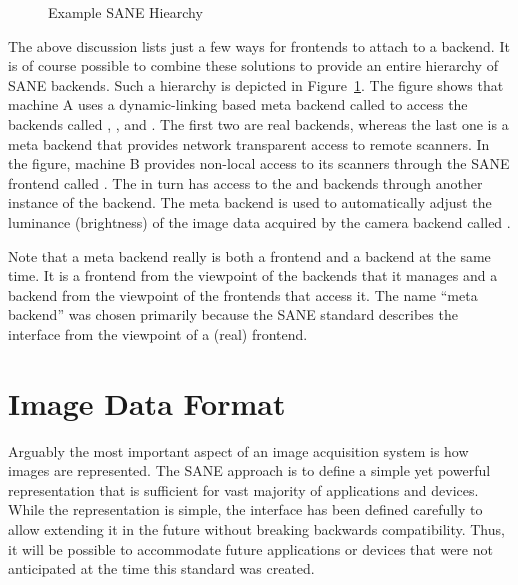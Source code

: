 \documentclass[11pt,DVIps]{report}
\begin{document}
\begin{figure}[htbp]
  \begin{center}
    \leavevmode
    \caption{Example SANE Hiearchy}
    \label{fig:hierarchy}
  \end{center}
\end{figure}

The above discussion lists just a few ways for frontends to attach to
a backend.  It is of course possible to combine these solutions to
provide an entire hierarchy of SANE backends.  Such a hierarchy is
depicted in Figure~\ref{fig:hierarchy}.  The figure shows that machine
A uses a dynamic-linking based meta backend called  to
access the backends called , , and .
The first two are real backends, whereas the last one is a meta
backend that provides network transparent access to remote scanners.
In the figure, machine B provides non-local access to its scanners
through the SANE frontend called .  The  in
turn has access to the  and  backends through
another instance of the  backend.  The  meta
backend is used to automatically adjust the luminance (brightness) of
the image data acquired by the camera backend called .

Note that a meta backend really is both a frontend and a backend at
the same time.  It is a frontend from the viewpoint of the backends
that it manages and a backend from the viewpoint of the frontends that
access it.  The name ``meta backend'' was chosen primarily because the
SANE standard describes the interface from the viewpoint of a (real)
frontend.


\section{Image Data Format}\label{sec:imageformat}

Arguably the most important aspect of an image acquisition system is how
images are represented. The SANE approach is to define a simple yet powerful
representation that is sufficient for vast majority of applications and
devices. While the representation is simple, the interface has been defined
carefully to allow extending it in the future without breaking backwards
compatibility. Thus, it will be possible to accommodate future applications or
devices that were not anticipated at the time this standard was created.
\end{document}
